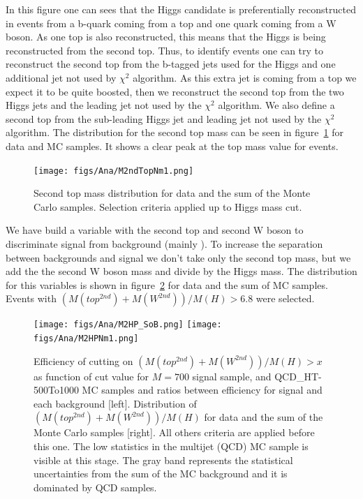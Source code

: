 In this figure one can sees that the Higgs candidate is preferentially reconstructed in \ttbar events from a b-quark coming from a top and one quark coming from a W boson. As one top is also reconstructed, this means that the Higgs is being reconstructed from the second top. Thus, to identify \ttbar events one can try to reconstruct the second top from the b-tagged jets used for the Higgs and one additional jet not used by $\chi^{2}$ algorithm. As this extra jet is coming from a top we expect it to be quite boosted, then we reconstruct the second top from the two Higgs jets and the leading jet not used by the $\chi^{2}$ algorithm. We also define a second top from the sub-leading Higgs jet and leading jet not used by the $\chi^{2}$ algorithm. The distribution for the second top mass can be seen in figure~\ref{fig:2ndTM} for data and MC samples. It shows a clear peak at the top mass value for \ttbar events.

\begin{figure}[!Hhtbp]
  \begin{center}
    \texttt{[image: figs/Ana/M2ndTopNm1.png]}
    \caption{Second top mass distribution for data and the sum of the Monte Carlo samples. Selection criteria applied up to Higgs mass cut.}
    \label{fig:2ndTM}
  \end{center}
\end{figure}

We have build a variable with the second top and second W boson to discriminate signal from background (mainly \ttbar). To increase the separation between backgrounds and signal we don't take only the second top mass, but we add the the second W boson mass and divide by the Higgs mass. The distribution for this variables is shown in figure~\ref{fig:m2thp} for data and the sum of MC samples. Events with $(M(top^{2nd})+M(W^{2nd}))/M(H)>6.8$ were selected.

\begin{figure}[!Hhtbp]
  \begin{center}
    \texttt{[image: figs/Ana/M2HP\_SoB.png]}
    \texttt{[image: figs/Ana/M2HPNm1.png]}
    \caption{Efficiency of cutting on $(M(top^{2nd})+M(W^{2nd}))/M(H)>x$ as function of cut value for $M=700$ \GeVcc signal sample, \ttbar and QCD\_HT-500To1000 MC samples and ratios between efficiency for signal and each background [left]. Distribution of $(M(top^{2nd})+M(W^{2nd}))/M(H)$ for data and the sum of the Monte Carlo samples [right]. All others criteria are applied before this one. The low statistics in the multijet (QCD) MC sample is visible at this stage. The gray band represents the statistical uncertainties from the sum of the MC background and it is dominated by QCD samples.}
    \label{fig:m2thp}
  \end{center}
\end{figure}

